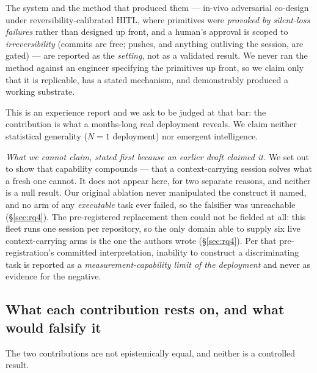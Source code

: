 \documentclass[10pt,conference]{IEEEtran}   %
\begin{document}
The system and the method that produced them --- in-vivo adversarial co-design under
reversibility-calibrated HITL, where primitives were \emph{provoked by silent-loss failures} rather
than designed up front, and a human's approval is scoped to \emph{irreversibility} (commits are
free; pushes, and anything outliving the session, are gated) --- are reported as the \emph{setting},
not as a validated result. We never ran the method against an engineer specifying the primitives up
front, so we claim only that it is replicable, has a stated mechanism, and demonstrably produced a
working substrate.

This is an experience report and we ask to be judged at that bar: the contribution is what a
months-long real deployment reveals. We claim neither statistical generality ($N{=}1$ deployment)
nor emergent intelligence.

\emph{What we cannot claim, stated first because an earlier draft claimed it.} We set out to show
that capability compounds --- that a context-carrying session solves what a fresh one cannot. It
does not appear here, for two separate reasons, and neither is a null result. Our original ablation
never manipulated the construct it named, and no arm of any \emph{executable} task ever failed, so the falsifier was
unreachable (\S\ref{sec:rq4}). The pre-registered replacement then could not be fielded at all: this fleet
runs one session per repository, so the only domain able to supply six live context-carrying arms is
the one the authors wrote (\S\ref{sec:rq4}). Per that pre-registration's committed interpretation, inability
to construct a discriminating task is reported as a \emph{measurement-capability limit of the
deployment} and never as evidence for the negative.

\subsection{What each contribution rests on, and what would falsify it}
\label{sec:falsify}
The two contributions are not epistemically equal, and neither is a controlled result.
\end{document}
